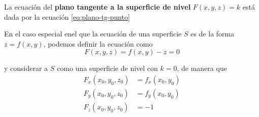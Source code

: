 \documentclass[12pt]{article}
\begin{document}
La ecuación del \textbf{plano tangente a la superficie de nivel} $ F(x,y,z) = k $ está dada por la ecuación \ref{eq:plano-tg-punto}

En el caso especial enel que la ecuación de una superficie $ S $ es de la forma $ z=f(x,y) $, podemos definir la ecuación como
\[
  F(x,y,z) = f(x,y) - z = 0
\]

y considerar a $ S $ como una superficie de nivel con $ k=0 $, de manera que
\begin{align*}
  F_{x}(x_{0},y_{0},z_{0}) &= f_{x}(x_{0},y_{0})\\
  F_{y}(x_{0},y_{0},z_{0}) &= f_{y}(x_{0},y_{0})\\
  F_{z}(x_{0},y_{0},z_{0}) &= -1
\end{align*}






\newpage
{}
\printbibliography
\end{document}
